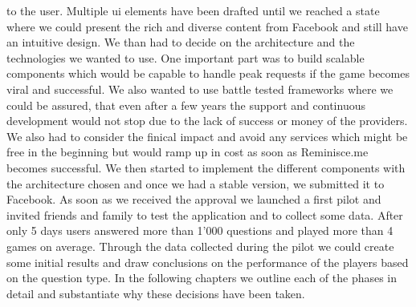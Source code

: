 to the user. Multiple ui elements have been drafted until we reached a state where we could
present the rich and diverse content from Facebook and still have an intuitive design.
We than had to decide on the architecture and the technologies we wanted to use. One
important part was to build scalable components which would be capable to handle peak
requests if the game becomes viral and successful. We also wanted to use battle tested
frameworks where we could be assured, that even after a few years the support and continuous
development would not stop due to the lack of success or money of the providers. We also had
to consider the finical impact and avoid any services which might be free in the beginning but
would ramp up in cost as soon as Reminisce.me becomes successful.
We then started to implement the different components with the architecture chosen and once
we had a stable version, we submitted it to Facebook. As soon as we received the approval we
launched a first pilot and invited friends and family to test the application and to collect some
data.
After only 5 days users answered more than 1’000 questions and played more than 4 games on
average. Through the data collected during the pilot we could create some initial results and
draw conclusions on the performance of the players based on the question type.
In the following chapters we outline each of the phases in detail and substantiate why these
decisions have been taken.
